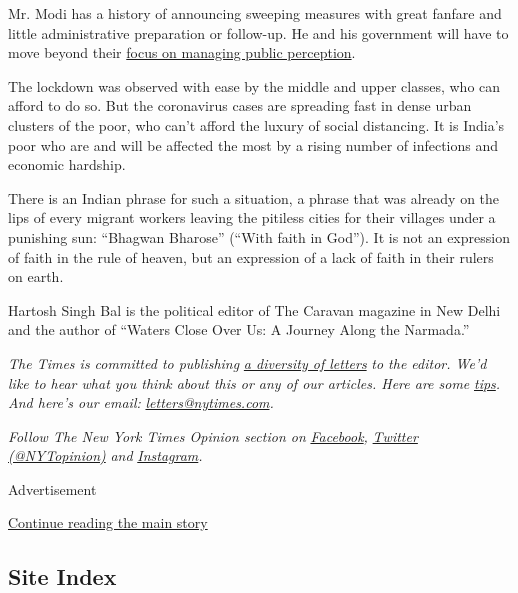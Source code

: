 Mr. Modi has a history of announcing sweeping measures with great
fanfare and little administrative preparation or follow-up. He and his
government will have to move beyond their
\href{https://www.narendramodi.in/prime-minister-narendra-modi-interacts-with-print-media-journalists-and-stakeholders-548937}{focus
on managing public perception}.

The lockdown was observed with ease by the middle and upper classes, who
can afford to do so. But the coronavirus cases are spreading fast in
dense urban clusters of the poor, who can't afford the luxury of social
distancing. It is India's poor who are and will be affected the most by
a rising number of infections and economic hardship.

There is an Indian phrase for such a situation, a phrase that was
already on the lips of every migrant workers leaving the pitiless cities
for their villages under a punishing sun: ``Bhagwan Bharose'' (``With
faith in God''). It is not an expression of faith in the rule of heaven,
but an expression of a lack of faith in their rulers on earth.

Hartosh Singh Bal is the political editor of The Caravan magazine in New
Delhi and the author of ``Waters Close Over Us: A Journey Along the
Narmada.''

\emph{The Times is committed to publishing}
\href{https://www.nytimes.com/2019/01/31/opinion/letters/letters-to-editor-new-york-times-women.html}{\emph{a
diversity of letters}} \emph{to the editor. We'd like to hear what you
think about this or any of our articles. Here are some}
\href{https://help.nytimes.com/hc/en-us/articles/115014925288-How-to-submit-a-letter-to-the-editor}{\emph{tips}}\emph{.
And here's our email:}
\href{mailto:letters@nytimes.com}{\emph{letters@nytimes.com}}\emph{.}

\emph{Follow The New York Times Opinion section on}
\href{https://www.facebook.com/nytopinion}{\emph{Facebook}}\emph{,}
\href{http://twitter.com/NYTOpinion}{\emph{Twitter (@NYTopinion)}}
\emph{and}
\href{https://www.instagram.com/nytopinion/}{\emph{Instagram}}\emph{.}

Advertisement

\protect\hyperlink{after-bottom}{Continue reading the main story}

\hypertarget{site-index}{%
\subsection{Site Index}\label{site-index}}

